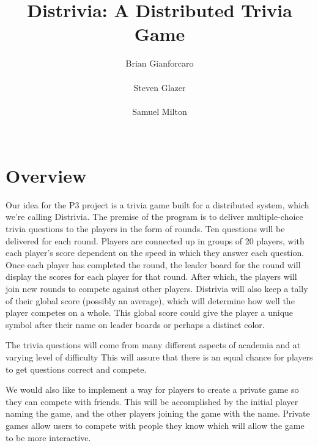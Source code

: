 \documentclass{dependencies/acm_proc_article-sp}
\begin{document}
\title{ Distrivia: A Distributed Trivia Game }
\author{
\alignauthor
Brian Gianforcaro \\
       \\
\alignauthor
Steven Glazer \\
       \\
\alignauthor
Samuel Milton \\
       \\
}
\maketitle


\section{Overview}
Our idea for the P3 project is a trivia game built for a distributed system, which we're calling Distrivia.
The premise of the program is to deliver multiple-choice trivia questions to the players in the form of rounds.
Ten questions will be delivered for each round.
Players are connected up in groups of 20 players, with each player's score dependent on the speed in which they answer each question.
Once each player has completed the round, the leader board for the round will display the scores for each player for that round.
After which, the players will join new rounds to compete against other players.
Distrivia will also keep a tally of their global score (possibly an average), which will determine how well the player competes on a whole.
This global score could give the player a unique symbol after their name on leader boards or perhaps a distinct color.


The trivia questions will come from many different aspects of academia and at varying level of difficulty
This will assure that there is an equal chance for players to get questions correct and compete.


We would also like to implement a way for players to create a private game so they can compete with friends.
This will be accomplished by the initial player naming the game, and the other players joining the game with the name.
Private games allow users to compete with people they know which will allow the game to be more interactive.
\end{document}
